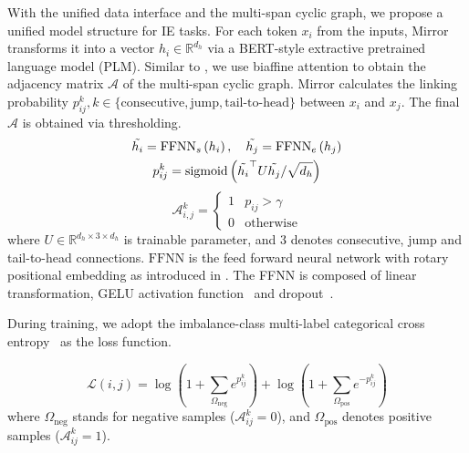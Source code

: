 With the unified data interface and the multi-span cyclic graph, we propose a unified model structure for IE tasks.
For each token $x_i$ from the inputs, Mirror transforms it into a vector $h_i \in \mathbb{R}^{d_h}$ via a BERT-style extractive pretrained language model (PLM).
Similar to \citet{ner-as-dp}, we use biaffine attention to obtain the adjacency matrix $\mathcal{A}$ of the multi-span cyclic graph.
Mirror calculates the linking probability $p_{ij}^{k}, k \in \{\text{consecutive}, \text{jump}, \text{tail-to-head}\}$ between $x_i$ and $x_j$.
The final $\mathcal{A}$ is obtained via thresholding.
\begin{equation}
    \label{eqn:sim_calc}
    \begin{gathered}
    \tilde{h_i} = \text{FFNN}_{s}\left(h_i\right), \quad \tilde{h_j} = \text{FFNN}_{e}\left(h_j\right) \\
    p_{ij}^{k} = \text{sigmoid}\left(\tilde{h_i}^{\top} U \tilde{h_j} / \sqrt{d_h}\right)
    \end{gathered} \\
\end{equation}
\begin{equation}
    \label{eqn:adjacent}
    \mathcal{A}_{i,j}^{k} = \begin{cases}
        1 & p_{ij} > \gamma \\
        0 & \text{otherwise}
    \end{cases}
\end{equation}
where $U \in \mathbb{R}^{d_h \times 3 \times d_h}$ is trainable parameter, and 3 denotes consecutive, jump and tail-to-head connections.
$\text{FFNN}$ is the feed forward neural network with rotary positional embedding as introduced in \citet{roformer}.
The FFNN is composed of linear transformation, GELU activation function~\cite{gelu} and dropout~\cite{dropout}.

During training, we adopt the imbalance-class multi-label categorical cross entropy~\cite{global_pointer} as the loss function.

\begin{equation}
    \label{eqn:loss}
    \mathcal{L}(i,j) = \log \left(1 + \sum_{\Omega_{\text{neg}}} e^{p_{ij}^{k}}\right) + \log \left(1 + \sum_{\Omega_{\text{pos}}} e^{-p_{ij}^{k}}\right)
\end{equation}
where $\Omega_{\text{neg}}$ stands for negative samples ($\mathcal{A}_{ij}^{k}=0$), and $\Omega_{\text{pos}}$ denotes positive samples ($\mathcal{A}_{ij}^{k}=1$).

